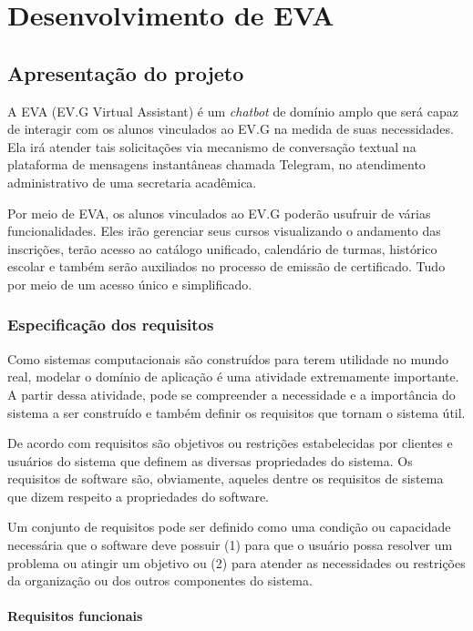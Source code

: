 \chapter{Desenvolvimento de EVA}

\section{Apresentação do projeto}

A EVA (EV.G Virtual Assistant) é um \textit{chatbot} de domínio amplo que será capaz de interagir com os alunos vinculados ao EV.G na medida de suas necessidades. Ela irá atender tais solicitações via mecanismo de conversação textual na plataforma de mensagens instantâneas chamada Telegram, no atendimento administrativo de uma secretaria acadêmica.

Por meio de EVA, os alunos vinculados ao EV.G poderão usufruir de várias funcionalidades. Eles irão gerenciar seus cursos visualizando o andamento das inscrições, terão acesso ao catálogo unificado, calendário de turmas, histórico escolar e também serão auxiliados no processo de emissão de certificado. Tudo por meio de um acesso único e simplificado.

\subsection{Especificação dos requisitos}

Como sistemas computacionais são construídos para terem utilidade no mundo real, modelar o domínio de aplicação é uma atividade extremamente importante. A partir dessa atividade, pode se compreender a necessidade e a importância do sistema a ser construído e também definir os requisitos que tornam o sistema útil.

De acordo com \cite{} requisitos são objetivos ou restrições estabelecidas por clientes e usuários do sistema que definem as diversas propriedades do sistema. Os requisitos  de software são, obviamente, aqueles dentre os requisitos de sistema que dizem respeito a propriedades do software.

Um conjunto de requisitos pode ser definido como uma condição ou capacidade necessária que o software deve possuir (1) para que o usuário possa resolver um problema ou atingir um objetivo ou (2) para atender as necessidades ou restrições da organização ou dos outros componentes do sistema.

\subsubsection{Requisitos funcionais}

